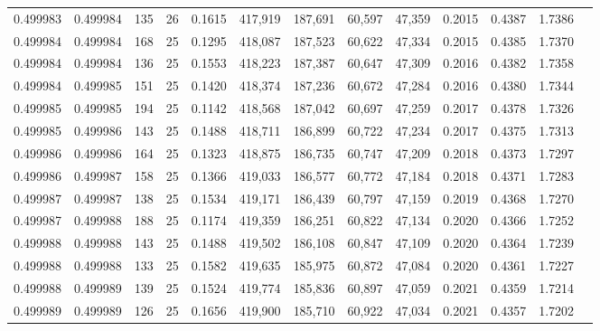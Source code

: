 \begin{tabular}{rrrrrrrrrrrrr}
0.499983 & 0.499984 & 135 &  26 &                                     0.1615 & 417,919 & 187,691 &  60,597 &  47,359 & 0.2015 & 0.4387 & 1.7386 \\
0.499984 & 0.499984 & 168 &  25 &                                     0.1295 & 418,087 & 187,523 &  60,622 &  47,334 & 0.2015 & 0.4385 & 1.7370 \\
0.499984 & 0.499984 & 136 &  25 &                                     0.1553 & 418,223 & 187,387 &  60,647 &  47,309 & 0.2016 & 0.4382 & 1.7358 \\
0.499984 & 0.499985 & 151 &  25 &                                     0.1420 & 418,374 & 187,236 &  60,672 &  47,284 & 0.2016 & 0.4380 & 1.7344 \\
0.499985 & 0.499985 & 194 &  25 &                                     0.1142 & 418,568 & 187,042 &  60,697 &  47,259 & 0.2017 & 0.4378 & 1.7326 \\
0.499985 & 0.499986 & 143 &  25 &                                     0.1488 & 418,711 & 186,899 &  60,722 &  47,234 & 0.2017 & 0.4375 & 1.7313 \\
0.499986 & 0.499986 & 164 &  25 &                                     0.1323 & 418,875 & 186,735 &  60,747 &  47,209 & 0.2018 & 0.4373 & 1.7297 \\
0.499986 & 0.499987 & 158 &  25 &                                     0.1366 & 419,033 & 186,577 &  60,772 &  47,184 & 0.2018 & 0.4371 & 1.7283 \\
0.499987 & 0.499987 & 138 &  25 &                                     0.1534 & 419,171 & 186,439 &  60,797 &  47,159 & 0.2019 & 0.4368 & 1.7270 \\
0.499987 & 0.499988 & 188 &  25 &                                     0.1174 & 419,359 & 186,251 &  60,822 &  47,134 & 0.2020 & 0.4366 & 1.7252 \\
0.499988 & 0.499988 & 143 &  25 &                                     0.1488 & 419,502 & 186,108 &  60,847 &  47,109 & 0.2020 & 0.4364 & 1.7239 \\
0.499988 & 0.499988 & 133 &  25 &                                     0.1582 & 419,635 & 185,975 &  60,872 &  47,084 & 0.2020 & 0.4361 & 1.7227 \\
0.499988 & 0.499989 & 139 &  25 &                                     0.1524 & 419,774 & 185,836 &  60,897 &  47,059 & 0.2021 & 0.4359 & 1.7214 \\
0.499989 & 0.499989 & 126 &  25 &                                     0.1656 & 419,900 & 185,710 &  60,922 &  47,034 & 0.2021 & 0.4357 & 1.7202 \\

\end{tabular}

